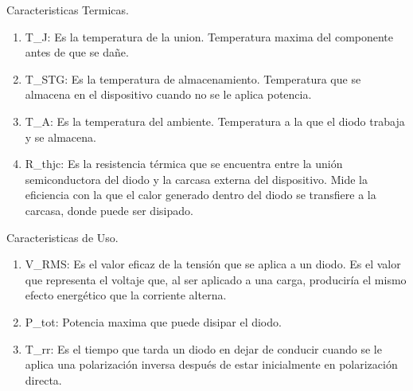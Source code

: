 \documentclass[chaptersright]{informeutn}
\begin{document}
        Caracteristicas Termicas.

        \begin{enumerate}
            \item T_J: Es la temperatura de la union. Temperatura maxima del componente antes de que se dañe.
            \item T_STG: Es la temperatura de almacenamiento. Temperatura que se almacena en el dispositivo cuando no se le aplica potencia.
            \item T_A: Es la temperatura del ambiente. Temperatura a la que el diodo trabaja y se almacena.
            \item R_thjc: Es la resistencia térmica que se encuentra entre la unión semiconductora del diodo y la carcasa externa del dispositivo. Mide la eficiencia con la que el calor generado dentro del diodo se transfiere a la carcasa, donde puede ser disipado. 
        \end{enumerate}


        Caracteristicas de Uso.

        \begin{enumerate}
            \item V_RMS: Es el valor eficaz de la tensión que se aplica a un diodo. Es el valor que representa el voltaje que, al ser aplicado a una carga, produciría el mismo efecto energético que la corriente alterna.
            \item P_tot: Potencia maxima que puede disipar el diodo.
            \item T_rr: Es el tiempo que tarda un diodo en dejar de conducir cuando se le aplica una polarización inversa después de estar inicialmente en polarización directa.
        \end{enumerate}

  \printbibliography
\end{document}

